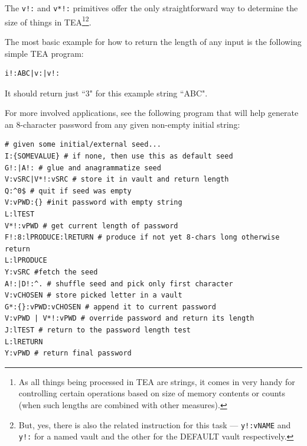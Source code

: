 \documentclass[a4paper, 18pt]{book} %
\begin{document}
{{{The \texttt{v!:} and \texttt{v*!:} primitives offer the only straightforward way to determine the size of things in TEA\footnote{As all things being processed in TEA are strings, it comes in very handy for controlling certain operations based on size of memory contents or counts (when such lengths are combined with other measures).}\footnote{But, yes, there is also the related instruction for this task --- \texttt{y!:vNAME} and \texttt{y!:} for a named vault and the other for the DEFAULT vault respectively.}.


\vspace{2em}


The most basic example for how to return the length of any input is the following simple TEA program:


\vspace{2em}

  \begin{tcolorbox}[teaterminalstyle, title=V: EXAMPLE 2: Length of a String, breakable]
  \begin{lstlisting}[language=TEA,breaklines=true,]
i!:ABC|v:|v!:
   \end{lstlisting}
  \end{tcolorbox}

\vspace{2em}

It should return just ``3" for this example string ``ABC".


\vspace{2em}

For more involved applications, see the following program that will help generate an 8-character password from any given non-empty initial string:

\vspace{2em}

  \begin{tcolorbox}[teaterminalstyle, title=V: EXAMPLE 3: 8-letter Password Generator, breakable]
  \begin{lstlisting}[language=TEA,breaklines=true,]
# given some initial/external seed...
I:{SOMEVALUE} # if none, then use this as default seed
G!:|A!: # glue and anagrammatize seed
V:vSRC|V*!:vSRC # store it in vault and return length
Q:^0$ # quit if seed was empty
V:vPWD:{} #init password with empty string
L:lTEST
V*!:vPWD # get current length of password
F!:8:lPRODUCE:lRETURN # produce if not yet 8-chars long otherwise return
L:lPRODUCE
Y:vSRC #fetch the seed
A!:|D!:^. # shuffle seed and pick only first character
V:vCHOSEN # store picked letter in a vault
G*:{}:vPWD:vCHOSEN # append it to current password
V:vPWD | V*!:vPWD # override password and return its length
J:lTEST # return to the password length test
L:lRETURN
Y:vPWD # return final password
   \end{lstlisting}
  \end{tcolorbox}

}}}
\end{document}
